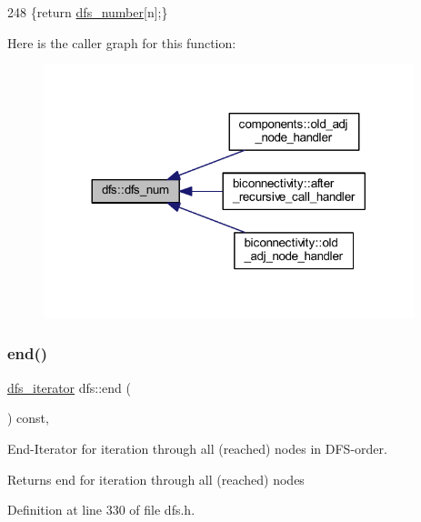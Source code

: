 \begin{DoxyCode}
248     \{\textcolor{keywordflow}{return} \mbox{\hyperlink{classdfs_a99727f2274d6af63daae4f0518f3adbe}{dfs\_number}}[n];\}
\end{DoxyCode}
Here is the caller graph for this function\+:
\nopagebreak
\begin{figure}[H]
\begin{center}
\leavevmode
\includegraphics[width=305pt]{classdfs_a315f16831a0bd333960e87e045cb37c8_icgraph}
\end{center}
\end{figure}
\mbox{\label{classdfs_af847633fa642258d3522e8deb26aef37}} 
\subsubsection{\texorpdfstring{end()}{end()}}
{\footnotesize\ttfamily \mbox{\hyperlink{classdfs_a15fe023a5a1f7ddda00f3d87110d9a32}{dfs\+\_\+iterator}} dfs\+::end (\begin{DoxyParamCaption}{ }\end{DoxyParamCaption}) const\hspace{0.3cm}{\ttfamily [inline]}, {\ttfamily [inherited]}}



End-\/\+Iterator for iteration through all (reached) nodes in D\+F\+S-\/order. 

\begin{DoxyReturn}{Returns}
end for iteration through all (reached) nodes 
\end{DoxyReturn}


Definition at line 330 of file dfs.\+h.


